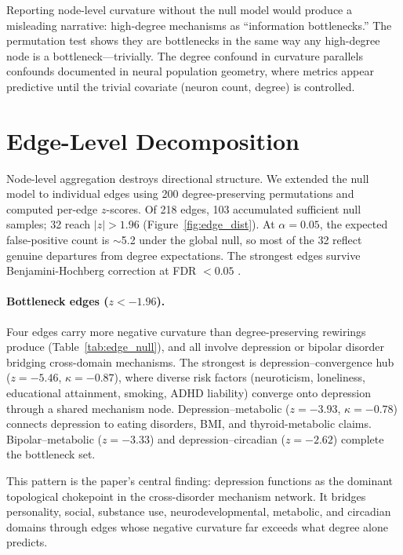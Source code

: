 \documentclass{article}
\begin{document}
Reporting node-level curvature without the null model would produce a misleading narrative: high-degree mechanisms as ``information bottlenecks.'' The permutation test shows they are bottlenecks in the same way any high-degree node is a bottleneck---trivially. The degree confound in curvature parallels confounds documented in neural population geometry, where metrics appear predictive until the trivial covariate (neuron count, degree) is controlled.

\section{Edge-Level Decomposition}
\label{sec:edge}

Node-level aggregation destroys directional structure. We extended the null model to individual edges using 200 degree-preserving permutations and computed per-edge $z$-scores. Of 218 edges, 103 accumulated sufficient null samples; 32 reach $|z| > 1.96$ (Figure~\ref{fig:edge_dist}). At $\alpha = 0.05$, the expected false-positive count is $\sim$5.2 under the global null, so most of the 32 reflect genuine departures from degree expectations. The strongest edges survive Benjamini-Hochberg correction at FDR $< 0.05$ \citep{benjamini1995controlling}.

\paragraph{Bottleneck edges ($z < -1.96$).} Four edges carry more negative curvature than degree-preserving rewirings produce (Table~\ref{tab:edge_null}), and all involve depression or bipolar disorder bridging cross-domain mechanisms. The strongest is depression--convergence hub ($z = -5.46$, $\kappa = -0.87$), where diverse risk factors (neuroticism, loneliness, educational attainment, smoking, ADHD liability) converge onto depression through a shared mechanism node. Depression--metabolic ($z = -3.93$, $\kappa = -0.78$) connects depression to eating disorders, BMI, and thyroid-metabolic claims. Bipolar--metabolic ($z = -3.33$) and depression--circadian ($z = -2.62$) complete the bottleneck set.

This pattern is the paper's central finding: depression functions as the dominant topological chokepoint in the cross-disorder mechanism network. It bridges personality, social, substance use, neurodevelopmental, metabolic, and circadian domains through edges whose negative curvature far exceeds what degree alone predicts.
\end{document}
